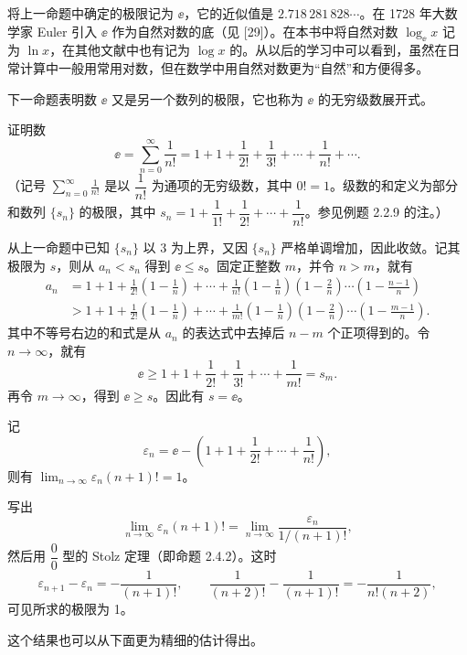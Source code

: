 将上一命题中确定的极限记为 $\ee$，它的近似值是 $2.718\,281\,828\cdots$。在 1728 年大数学家 Euler 引入 $\ee$ 作为自然对数的底（见 [29]）。在本书中将自然对数 $\log_{\ee}x$ 记为 $\ln x$，在其他文献中也有记为 $\log x$ 的。从以后的学习中可以看到，虽然在日常计算中一般用常用对数，但在数学中用自然对数更为“自然”和方便得多。

下一命题表明数 $\ee$ 又是另一个数列的极限，它也称为 $\ee$ 的无穷级数展开式。

\begin{xproposition}[2.5.2]
证明数
\[
  \ee=\sum_{n=0}^{\infty}\frac1{n!}
  =1+1+\frac1{2!}+\frac1{3!}+\cdots+\frac1{n!}+\cdots.
\]
（记号 $\displaystyle\sum_{n=0}^{\infty}\frac1{n!}$ 是以 $\dfrac1{n!}$ 为通项的无穷级数，其中 $0!=1$。级数的和定义为部分和数列 $\{s_n\}$ 的极限，其中 $s_n=1+\dfrac1{1!}+\dfrac1{2!}+\cdots+\dfrac1{n!}$。参见例题 2.2.9 的注。）
\end{xproposition}
\begin{xproof}
从上一命题中已知 $\{s_n\}$ 以 $3$ 为上界，又因 $\{s_n\}$ 严格单调增加，因此收敛。记其极限为 $s$，则从 $a_n<s_n$ 得到 $\ee\le s$。固定正整数 $m$，并令 $n>m$，就有
\begin{align*}
  a_n
  &=1+1+\frac1{2!}\left(1-\frac1n\right)+\cdots
  +\frac1{n!}\left(1-\frac1n\right)\left(1-\frac2n\right)\cdots\left(1-\frac{n-1}{n}\right)\\
  &>1+1+\frac1{2!}\left(1-\frac1n\right)+\cdots
  +\frac1{m!}\left(1-\frac1n\right)\left(1-\frac2n\right)\cdots\left(1-\frac{m-1}{n}\right).
\end{align*}
其中不等号右边的和式是从 $a_n$ 的表达式中去掉后 $n-m$ 个正项得到的。令 $n\to\infty$，就有
\[
  \ee\ge1+1+\frac1{2!}+\frac1{3!}+\cdots+\frac1{m!}=s_m.
\]
再令 $m\to\infty$，得到 $\ee\ge s$。因此有 $s=\ee$。
\end{xproof}

\begin{xproposition}[2.5.3]
记
\[
  \varepsilon_n=\ee-\left(1+1+\frac1{2!}+\cdots+\frac1{n!}\right),
\]
则有 $\displaystyle\lim_{n\to\infty}\varepsilon_n(n+1)!=1$。
\end{xproposition}
\begin{xproof}
写出
\[
  \lim_{n\to\infty}\varepsilon_n(n+1)!
  =\lim_{n\to\infty}\frac{\varepsilon_n}{1/(n+1)!},
\]
然后用 $\dfrac00$ 型的 Stolz 定理（即命题 2.4.2）。这时
\[
  \varepsilon_{n+1}-\varepsilon_n=-\frac1{(n+1)!},
  \qquad
  \frac1{(n+2)!}-\frac1{(n+1)!}=-\frac1{n!(n+2)},
\]
可见所求的极限为 1。
\end{xproof}

这个结果也可以从下面更为精细的估计得出。

